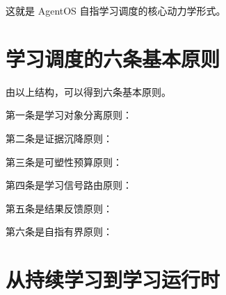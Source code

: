 这就是 AgentOS 自指学习调度的核心动力学形式。


\section{学习调度的六条基本原则}

由以上结构，可以得到六条基本原则。

第一条是学习对象分离原则：

\begin{statementbox}
\centering
{}
\end{statementbox}

第二条是证据沉降原则：

\begin{statementbox}
\centering
{}
\end{statementbox}

第三条是可塑性预算原则：

\begin{statementbox}
\centering
{}
\end{statementbox}

第四条是学习信号路由原则：

\begin{statementbox}
\centering
{}
\end{statementbox}

第五条是结果反馈原则：

\begin{statementbox}
\centering
{}
\end{statementbox}

第六条是自指有界原则：

\begin{statementbox}
\centering
{}
\end{statementbox}


\section{从持续学习到学习运行时}

